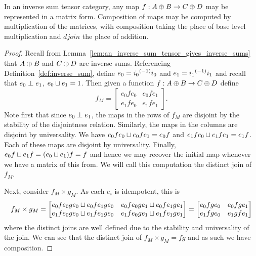 \begin{lemma}\label{lem:inverse_sum_category_maps_are_matrices}
  In an inverse sum tensor category, any map $f:A\oplus B \to C\oplus D$ may be represented in a matrix form.
  Composition of maps may be computed by multiplication of the matrices, with composition taking
  the place of base level multiplication and $djoin$ the place of addition.
\end{lemma}
\begin{proof}
  Recall from Lemma~\ref{lem:an_inverse_sum_tensor_gives_inverse_sums} that $A\oplus B$ and $C\oplus D$ are
  inverse sums. Referencing Definition~\ref{def:inverse_sum}, define $e_0 = {i_0}^{(-1)}i_0$ and $e_1
  = {i_1}^{(-1)}i_1$ and recall that $e_0 \perp e_1$, $e_0 \sqcup e_1 = 1$. Then given a function
  $f:A\oplus B \to C\oplus D$ define
  \[ f_M =
     \begin{bmatrix}
       e_0 f e_0 & e_0 f e_1 \\
       e_1 f e_0 & e_1 f e_1
      \end{bmatrix}.
  \]
  Note first that since $e_0 \perp e_1$, the maps in the rows of $f_M$ are disjoint by the
  stability of the disjointness relation. Similarly, the maps in the columns are disjoint by
  universality. We have $e_0 f e_0 \sqcup e_0 f e_1 = e_0 f$ and $e_1 f e_0 \sqcup e_1 f e_1 = e_1
  f$. Each of these maps are disjoint by universality. Finally, $e_0 f \sqcup e_1 f = (e_0 \sqcup
  e_1) f = f$ and hence we may recover the initial map whenever we have a matrix of this from.
  We will call this computation the distinct join of $f_M$.

  Next, consider $f_M \times g_M$. As each $e_i$ is idempotent, this is
  \[ f_M \times g_M =
     \begin{bmatrix}
       e_0 f e_0 g e_0 \sqcup e_0 f e_1 g e_0 & e_0 f e_0 g e_1 \sqcup e_0 f e_1 g e_1 \\
       e_1 f e_0 g e_0 \sqcup e_1 f e_1 g e_0 & e_1 f e_0 g e_1 \sqcup e_1 f e_1 g e_1
      \end{bmatrix}
      =
     \begin{bmatrix}
       e_0 f g e_0  & e_0 f  g e_1  \\
       e_1 f  g e_0 & e_1  g f e_1
      \end{bmatrix}
  \]
  where the distinct joins are well defined due to the stability and universality of the join.
  We can see that the distinct join of $f_M \times g_M = f g$ and as such we have composition.

\end{proof}

